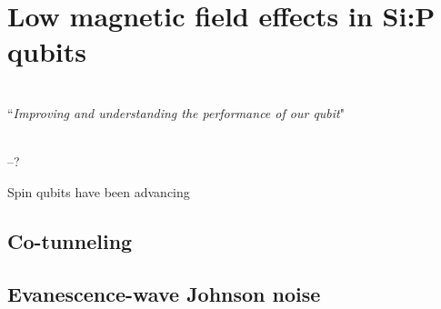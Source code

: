 
\chapter{Low magnetic field effects in Si:P qubits} %

\label{Chapter6} 


\HRule
\vspace{0.5cm} \hspace{2cm}
\small
\hangindent=4cm
\\
        ``\emph{Improving and understanding the performance of our qubit}"
\\ \\
\hangindent=4cm
\begin{flushright}
--? \\
\end{flushright}

\vspace{0.5cm}

\noindent \HRule
\clearpage

Spin qubits have been advancing 

\section{Co-tunneling}

\section{Evanescence-wave Johnson noise} \label{sec:ewjn}


